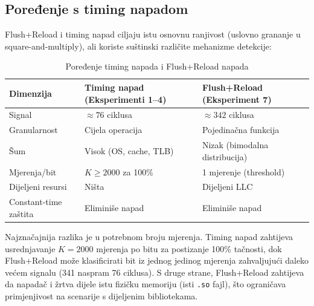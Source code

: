 \subsection{Poređenje s timing napadom}

Flush+Reload i timing napad ciljaju istu osnovnu ranjivost (uslovno grananje u square-and-multiply), ali koriste suštinski različite mehanizme detekcije:

\begin{table}[H]
\centering
\caption{Poređenje timing napada i Flush+Reload napada}
\label{tab:attack_comparison}
\begin{tabular}{lll}
\toprule
\textbf{Dimenzija} & \textbf{Timing napad (Eksperimenti 1--4)} & \textbf{Flush+Reload (Eksperiment 7)} \\
\midrule
Signal & $\approx 76$ ciklusa & $\approx 342$ ciklusa \\
Granularnost & Cijela operacija & Pojedinačna funkcija \\
Šum & Visok (OS, cache, TLB) & Nizak (bimodalna distribucija) \\
Mjerenja/bit & $K \geq 2000$ za 100\% & 1 mjerenje (threshold) \\
Dijeljeni resursi & Ništa & Dijeljeni LLC \\
Constant-time zaštita & Eliminiše napad & Eliminiše napad\footnotemark \\
\bottomrule
\end{tabular}
\end{table}


Najznačajnija razlika je u potrebnom broju mjerenja. Timing napad zahtijeva usrednjavanje $K = 2000$ mjerenja po bitu za postizanje 100\% tačnosti, dok Flush+Reload može klasificirati bit iz jednog jedinog mjerenja zahvaljujući daleko većem signalu (341 naspram 76 ciklusa). S druge strane, Flush+Reload zahtijeva da napadač i žrtva dijele istu fizičku memoriju (isti \texttt{.so} fajl), što ograničava primjenjivost na scenarije s dijeljenim bibliotekama.

